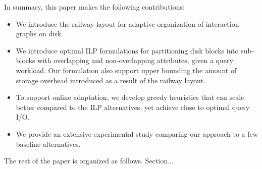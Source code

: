 In summary, this paper makes the following contributions:
\begin{itemize}
\item We introduce the railway layout for adaptive organization of interaction
graphs on disk. 
\item We introduce optimal ILP formulations for partitioning disk blocks into 
sub-blocks with overlapping and non-overlapping attributes, given a query
workload. Our formulation also support upper bounding the amount of storage
overhead introduced as a result of the railway layout.
\item To support online adaptation, we develop greedy heuristics that can scale
better compared to the ILP alternatives, yet achieve close to optimal query
I/O.
\item We provide an extensive experimental study comparing our approach to a
few baseline alternatives.
\end{itemize}

The rest of the paper is organized as follows. Section...




